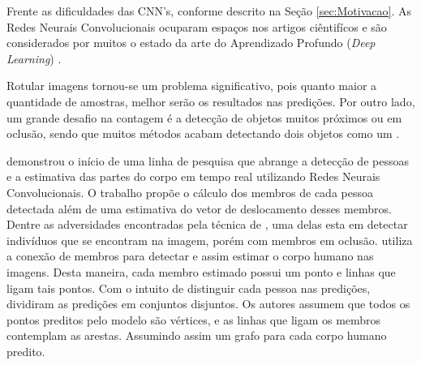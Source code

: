 
Frente as dificuldades das CNN's, conforme descrito na Seção \ref{sec:Motivacao}. As Redes Neurais Convolucionais ocuparam espaços nos artigos ciêntifícos e são considerados por muitos o estado da arte do Aprendizado Profundo (\textit{Deep Learning})
\cite{DBLP:journals/corr/abs-1904-00889, 8437104, 8489369, rs11010011, 8186148, Zhao2017CVPR,DBLP:journals/corr/CaoSWS16, 8186148,DBLP:journals/corr/CaoSWS16,articleLuiz}.


\label{sec:relatedWork}

Rotular imagens tornou-se um problema significativo, pois quanto maior a quantidade de amostras, melhor serão os resultados nas predições. 
Por outro lado, um grande desafio na contagem é a detecção de objetos muitos próximos ou em oclusão, sendo que muitos métodos acabam detectando dois objetos como um \cite{article,8451787,inproceedings, DBLP:journals/corr/abs-1711-04433, 8489369, 8127090, s17040905, DBLP:journals/corr/abs-1804-00307, articleLuiz,DBLP:journals/corr/CheangCT17a}. 

\cite{Cao2017} demonstrou o início de uma linha de pesquisa que abrange a detecção de pessoas e a estimativa das partes do corpo em tempo real utilizando Redes Neurais Convolucionais. O trabalho propõe o cálculo dos membros de cada pessoa detectada além de uma estimativa do vetor de deslocamento desses membros.
Dentre as adversidades encontradas pela técnica de \cite{Cao2017}, uma delas esta em detectar indivíduos que se encontram na imagem, porém com membros em oclusão. \cite{Cao2017} utiliza a conexão de membros para detectar e assim estimar o corpo humano nas imagens. Desta maneira,  cada membro estimado possui um ponto e linhas que ligam tais pontos.
Com o intuito de distinguir cada pessoa nas predições, \cite{Cao2017} dividiram as predições em conjuntos disjuntos.
Os autores assumem que todos os pontos preditos pelo modelo são vértices, e as linhas que ligam os membros contemplam as arestas. Assumindo assim um grafo para cada corpo humano predito.

